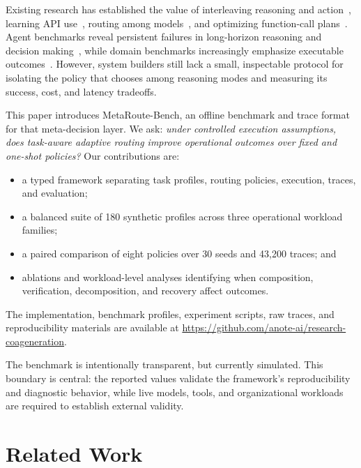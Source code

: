 \documentclass[sigconf]{acmart}
\begin{document}
Existing research has established the value of interleaving reasoning and action~\cite{yao2023react}, learning API use~\cite{schick2023toolformer,qin2024toolllm}, routing among models~\cite{chen2024frugalgpt,ong2025routellm}, and optimizing function-call plans~\cite{kim2024llmcompiler}. Agent benchmarks reveal persistent failures in long-horizon reasoning and decision making~\cite{liu2024agentbench}, while domain benchmarks increasingly emphasize executable outcomes~\cite{jimenez2024swebench,yao2024taubench}. However, system builders still lack a small, inspectable protocol for isolating the policy that chooses among reasoning modes and measuring its success, cost, and latency tradeoffs.

This paper introduces MetaRoute-Bench, an offline benchmark and trace format for that meta-decision layer. We ask: \emph{under controlled execution assumptions, does task-aware adaptive routing improve operational outcomes over fixed and one-shot policies?} Our contributions are:

\begin{itemize}
  \item a typed framework separating task profiles, routing policies, execution, traces, and evaluation;
  \item a balanced suite of 180 synthetic profiles across three operational workload families;
  \item a paired comparison of eight policies over 30 seeds and 43,200 traces; and
  \item ablations and workload-level analyses identifying when composition, verification, decomposition, and recovery affect outcomes.
\end{itemize}

The implementation, benchmark profiles, experiment scripts, raw traces, and reproducibility materials are available at \url{https://github.com/anote-ai/research-coageneration}.

The benchmark is intentionally transparent, but currently simulated. This boundary is central: the reported values validate the framework's reproducibility and diagnostic behavior, while live models, tools, and organizational workloads are required to establish external validity.

\section{Related Work}
\end{document}
